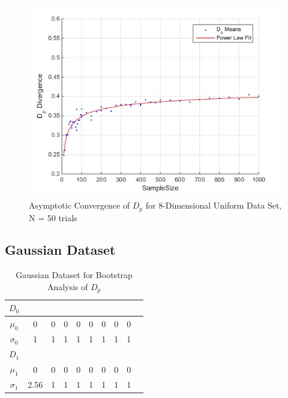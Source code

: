 \documentclass{article}
\begin{document}
	\begin{figure}[h!]
		\caption{Asymptotic Convergence of $D_p$ for 8-Dimensional Uniform Data Set, N = 50 trials}
		\centering
		\includegraphics[scale=0.6]{dp_n50_uniform}
	\end{figure}	
	

	\subsection*{\small Gaussian Dataset}
	\begin{table}[!h]
		\caption{Gaussian Dataset for Bootstrap Analysis of $D_p$}
		\centering %
		\begin{tabular}{c c c c c c c c c c} %
			$D_0$ &  &  &  \\ [0.5ex] %
			\hline %
			$\mu_0$ & 0 & 0 & 0 & 0 & 0 & 0 & 0 & 0\\[0.5ex] %
			$\sigma_0$ & 1 & 1 & 1 & 1 & 1 & 1 & 1 & 1\\[0.5ex]
			
			$D_1$ & \\ [0.5ex]
			
			\hline
			$\mu_1$ & 0 & 0 & 0 & 0 & 0 & 0 & 0 & 0\\[0.5ex] %
			$\sigma_1$ & 2.56 & 1 & 1 & 1 & 1 & 1 & 1 & 1\\[0.5ex]
			\hline %
		\end{tabular}
		\label{table:nonlin} %
	\end{table}
			
\end{document}
